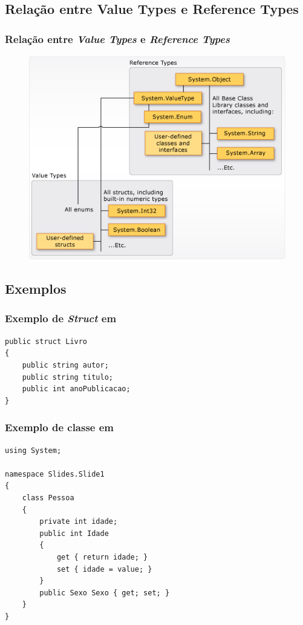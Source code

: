 \documentclass{beamer}
\begin{document}
\subsection{Relação entre Value Types e Reference Types}
\begin{frame}
\frametitle{Relação entre \textit{Value Types} e \textit{Reference Types}}
\begin{figure}
	\centering
	\includegraphics[width=0.78\linewidth]{img/valuetypescts.png}
	\label{fig:valuetypescts}
\end{figure}

\end{frame}

\subsection{Exemplos}
\begin{frame}[fragile]
\frametitle{Exemplo de \textit{Struct} em \CS}
\begin{lstlisting}[title=Definição da Struct Livro em \CS]
public struct Livro
{
	public string autor;
	public string titulo;
	public int anoPublicacao;
}

\end{lstlisting}
\end{frame}


\begin{frame}[fragile]
\frametitle{Exemplo de classe em \CS}
\begin{lstlisting}[title=Definição da classe Pessoa em \CS]
using System;

namespace Slides.Slide1
{
	class Pessoa
	{        
		private int idade;
		public int Idade 
		{ 
			get { return idade; } 
			set { idade = value; } 
		}
		public Sexo Sexo { get; set; }
	}
}

\end{lstlisting}
\end{frame}
\end{document}
